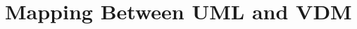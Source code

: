 \section{Mapping Between UML and  VDM}\label{sec:fromUMLtoVDM}\label{sec:syntaxcheck}
\label{sec:typecheck}






